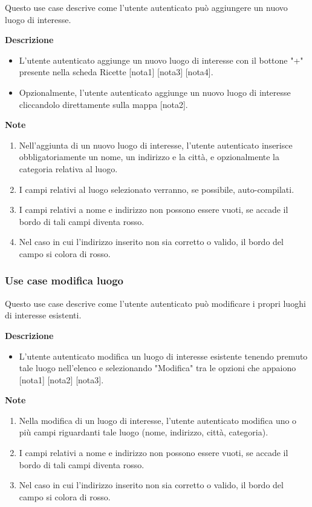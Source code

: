 \documentclass[a4paper,12pt]{article}
\begin{document}
Questo use case descrive come l'utente autenticato può aggiungere un nuovo luogo di interesse.

\textbf{Descrizione}
\begin{itemize} \setlength\itemsep{0.01em}
\item L'utente autenticato aggiunge un nuovo luogo di interesse con il bottone "+" presente nella scheda Ricette [nota1] [nota3] [nota4].
\item Opzionalmente, l'utente autenticato aggiunge un nuovo luogo di interesse cliccandolo direttamente sulla mappa [nota2].
\end{itemize}

\textbf{Note}
\begin{enumerate} \setlength\itemsep{0.01em}
\item Nell'aggiunta di un nuovo luogo di interesse, l'utente autenticato inserisce obbligatoriamente un nome, un indirizzo e la città, e opzionalmente la categoria relativa al luogo.
\item I campi relativi al luogo selezionato verranno, se possibile, auto-compilati.
\item I campi relativi a nome e indirizzo non possono essere vuoti, se accade il bordo di tali campi diventa rosso.
\item Nel caso in cui l'indirizzo inserito non sia corretto o valido, il bordo del campo si colora di rosso.
\end{enumerate}



\subsubsection*{Use case modifica luogo}

Questo use case descrive come l'utente autenticato può modificare i propri luoghi di interesse esistenti.

\textbf{Descrizione}
\begin{itemize} \setlength\itemsep{0.01em}
\item L'utente autenticato modifica un luogo di interesse esistente tenendo premuto tale luogo nell'elenco e selezionando "Modifica" tra le opzioni che appaiono [nota1] [nota2] [nota3].
\end{itemize}

\textbf{Note}
\begin{enumerate} \setlength\itemsep{0.01em}
\item Nella modifica di un luogo di interesse, l'utente autenticato modifica uno o più campi riguardanti tale luogo (nome, indirizzo, città, categoria).
\item I campi relativi a nome e indirizzo non possono essere vuoti, se accade il bordo di tali campi diventa rosso.
\item Nel caso in cui l'indirizzo inserito non sia corretto o valido, il bordo del campo si colora di rosso.
\end{enumerate}
\end{document}
